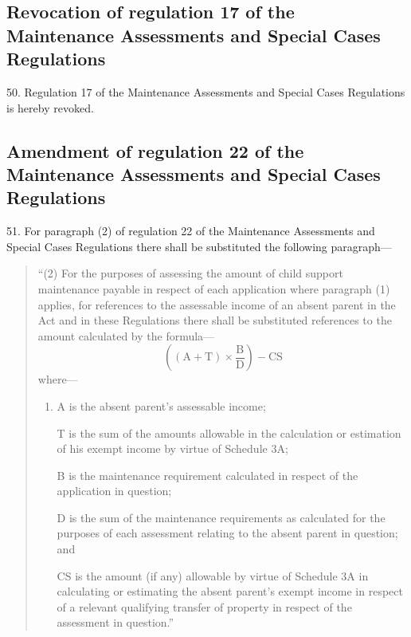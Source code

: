 \documentclass[12pt,a4paper]{article}
\begin{document}
\subsection[50. Revocation of regulation 17 of the Maintenance Assessments and Special Cases Regulations]{\sloppy Revocation of regulation 17 of the Maintenance Assessments and Special Cases Regulations}

50.  Regulation 17 of the Maintenance Assessments and Special Cases Regulations is hereby revoked.

\subsection[51. Amendment of regulation 22 of the Maintenance Assessments and Special Cases Regulations]{Amendment of regulation 22 of the Maintenance Assessments and Special Cases Regulations}

51.  For paragraph (2) of regulation 22 of the Maintenance Assessments and Special Cases Regulations there shall be substituted the following paragraph—
\begin{quotation}
“(2) For the purposes of assessing the amount of child support maintenance payable in respect of each application where paragraph (1) applies, for references to the assessable income of an absent parent in the Act and in these Regulations there shall be substituted references to the amount calculated by the formula—
\[ \left( (\mathrm{A} + \mathrm{T}) \times \frac{\mathrm{B}}{\mathrm{D}}\right) - \mathrm{CS}\]
where—
\begin{enumerate}\item[]
A is the absent parent’s assessable income;

T is the sum of the amounts allowable in the calculation or estimation of his exempt income by virtue of Schedule 3A;

B is the maintenance requirement calculated in respect of the application in question;

D is the sum of the maintenance requirements as calculated for the purposes of each assessment relating to the absent parent in question; and

CS is the amount (if any) allowable by virtue of Schedule 3A in calculating or estimating the absent parent’s exempt income in respect of a relevant qualifying transfer of property in respect of the assessment in question.”
\end{enumerate}
\end{quotation}
\end{document}
